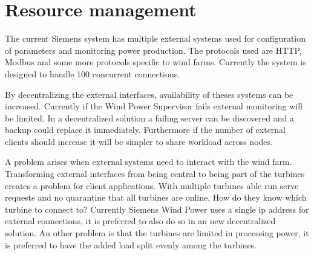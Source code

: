 \section{Resource management} %
\label{cha:resourceManagement}

The current Siemens system has multiple external systems used for configuration of parameters and monitoring power production. The protocols used are HTTP, Modbus and some more protocols specific to wind farms. Currently the system is designed to handle 100 concurrent connections.

By decentralizing the external interfaces, availability of theses systems can be increased. Currently if the Wind Power Supervisor fails external monitoring will be limited. In a decentralized solution a failing server can be discovered and a backup could replace it immediately. Furthermore if the number of external clients should increase it will be simpler to share workload across nodes.

A problem arises when external systems need to interact with the wind farm. 
Transforming external interfaces from being central to being part of the turbines creates a problem for client applications.
With multiple turbines able run serve requests and no quarantine that all turbines are online, How do they know which turbine to connect to?
Currently Siemens Wind Power uses a single ip address for external connections, it is preferred to also do so in an new decentralized solution.
An other problem is that the turbines are limited in processing power, it is preferred to have the added load split evenly among the turbines.

